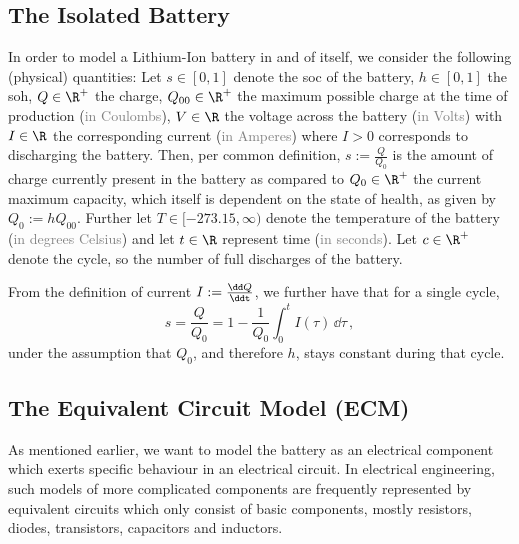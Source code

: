 \documentclass{prettytex/ox/mmsc-special-topic}
\begin{document}
  \subsection{The Isolated Battery}
  In order to model a Lithium-Ion battery in and of itself, we consider the following (physical) quantities:
  Let
  $s \in [0, 1]$ denote the \glsdesc{soc} of the battery,
  $h \in [0, 1]$ the \glsdesc{soh},
  $Q \in \R^+$ the charge,
  $Q_{00} \in \R^+$ the maximum possible charge at the time of production (\textcolor{gray}{in Coulombs}),
  $V \in \R$ the voltage across the battery (\textcolor{gray}{in Volts}) with
  $I \in \R$ the corresponding current (\textcolor{gray}{in Amperes}) where $I > 0$ corresponds to discharging the battery.
  Then, per common definition, $s := \frac{Q}{Q_0}$ is the amount of charge currently present in the battery as compared to $Q_0 \in \R^+$ the current maximum capacity, which itself is dependent on the state of health, as given by $Q_0 := h Q_{00}$.
  Further let
  $T \in [-273.15, \infty)$ denote the temperature of the battery (\textcolor{gray}{in degrees Celsius}) and
  let $t \in \R$ represent time (\textcolor{gray}{in seconds}).
  Let $c \in \R^+$ denote the cycle, so the number of full discharges of the battery.

  From the definition of current $I := \frac{\dd Q}{\ddt}$, we further have that for a single cycle,
  $$s = \frac{Q}{Q_0} = 1 - \frac{1}{Q_0} \int_0^t I(\tau) \,\dd\tau \,,$$
  under the assumption that $Q_0$, and therefore $h$, stays constant during that cycle.

  \subsection{The Equivalent Circuit Model (ECM)}
  As mentioned earlier, we want to model the battery as an electrical component which exerts specific behaviour in an electrical circuit.
  In electrical engineering, such models of more complicated components are frequently represented by equivalent circuits which only consist of basic components, mostly resistors, diodes, transistors, capacitors and inductors.
\end{document}
